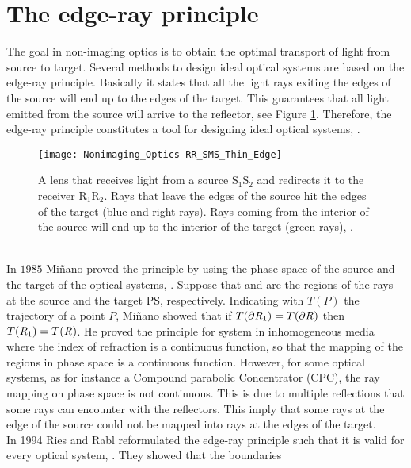 \section{The edge-ray principle}
The goal in non-imaging optics is to obtain the optimal transport of light from source to target. 
Several methods to design ideal optical systems are based on the edge-ray principle. 
Basically it states that all the light  rays exiting the edges of the source will end up to the edges of the target. 
This guarantees that all light emitted from the source will arrive to the reflector, see Figure \ref{fig:edge}. 
Therefore, the edge-ray principle constitutes a tool for designing ideal optical systems, \cite{welford1978problem, minano1992new}.
 \begin{figure}[h]
  \begin{center}
  \texttt{[image: Nonimaging\_Optics-RR\_SMS\_Thin\_Edge]}
  \end{center}
  \caption{A lens that receives light from a source $\textrm{S}_1\textrm{S}_2$ and redirects it to the receiver $\textrm{R}_1\textrm{R}_2$. 
Rays that leave the edges of the source hit the edges of the target (blue and right rays). Rays coming from the interior of the source will end up to the interior of the target (green rays), \cite{wiki2}.}
  \label{fig:edge}
\end{figure}
\\ \indent
In $1985$ Mi{\~n}ano proved the principle by using the phase space of the source and the target of the optical systems, \cite{minano1986design}. 
Suppose that  and  are the regions of the rays at the source and the target PS, respectively. 
Indicating with $T(P)$ the trajectory of a point $P$, Mi{\~n}ano showed that if $T(\partial\mbox{$\emph{R}_{\textit{$1$}}$})=T(\partial\mbox{$\emph{R}_{\textit{}}$})$ then $T(\mbox{$\emph{R}_{\textit{$1$}}$})=T(\mbox{$\emph{R}_{\textit{}}$})$. He proved the principle for system in inhomogeneous media where the index of refraction is a continuous function, so that the mapping of the regions in phase space is a continuous function. However, for some optical systems, as for instance a Compound parabolic Concentrator (CPC), the ray mapping on phase space is not continuous. This is due to multiple reflections that some rays can encounter with the reflectors. 
This imply that some rays at the edge of the source could not be mapped into rays at the edges of the target. \\ \indent 
In 1994 Ries and Rabl reformulated the edge-ray principle such that it is valid for every optical system, \cite{Ries:2}. They showed that the boundaries
